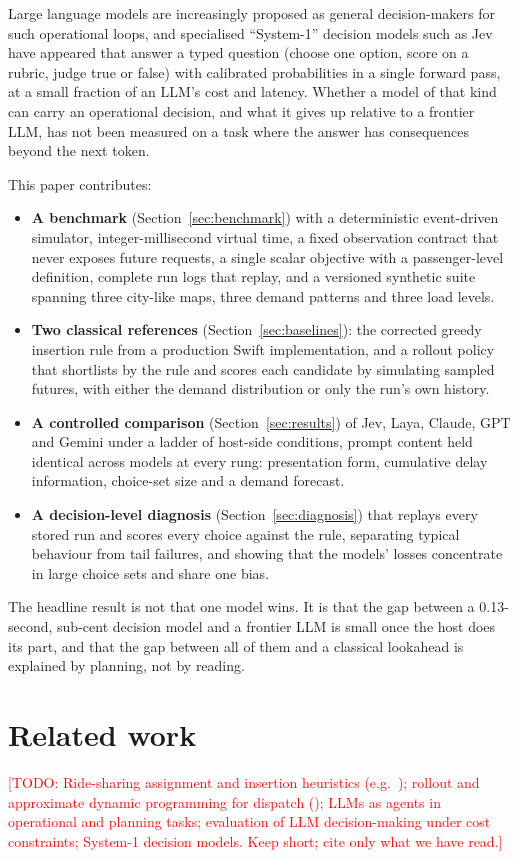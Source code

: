 \documentclass[11pt]{article}
\newcommand{\todo}[1]{\textcolor{red}{[TODO: #1]}}
\begin{document}
Large language models are increasingly proposed as general decision-makers for such operational loops, and specialised ``System-1'' decision models such as Jev~\cite{jev} have appeared that answer a typed question (choose one option, score on a rubric, judge true or false) with calibrated probabilities in a single forward pass, at a small fraction of an LLM's cost and latency. Whether a model of that kind can carry an operational decision, and what it gives up relative to a frontier LLM, has not been measured on a task where the answer has consequences beyond the next token.

This paper contributes:
\begin{itemize}
\item \textbf{A benchmark} (Section~\ref{sec:benchmark}) with a deterministic event-driven simulator, integer-millisecond virtual time, a fixed observation contract that never exposes future requests, a single scalar objective with a passenger-level definition, complete run logs that replay, and a versioned synthetic suite spanning three city-like maps, three demand patterns and three load levels.
\item \textbf{Two classical references} (Section~\ref{sec:baselines}): the corrected greedy insertion rule from a production Swift implementation, and a rollout policy that shortlists by the rule and scores each candidate by simulating sampled futures, with either the demand distribution or only the run's own history.
\item \textbf{A controlled comparison} (Section~\ref{sec:results}) of Jev, Laya, Claude, GPT and Gemini under a ladder of host-side conditions, prompt content held identical across models at every rung: presentation form, cumulative delay information, choice-set size and a demand forecast.
\item \textbf{A decision-level diagnosis} (Section~\ref{sec:diagnosis}) that replays every stored run and scores every choice against the rule, separating typical behaviour from tail failures, and showing that the models' losses concentrate in large choice sets and share one bias.
\end{itemize}

The headline result is not that one model wins. It is that the gap between a 0.13-second, sub-cent decision model and a frontier LLM is small once the host does its part, and that the gap between all of them and a classical lookahead is explained by planning, not by reading.

\section{Related work}
\todo{Ride-sharing assignment and insertion heuristics (e.g.\ \cite{alonso2017}); rollout and approximate dynamic programming for dispatch (\cite{bertsekas1997rollout,powell2011adp}); LLMs as agents in operational and planning tasks; evaluation of LLM decision-making under cost constraints; System-1 decision models. Keep short; cite only what we have read.}
\end{document}
